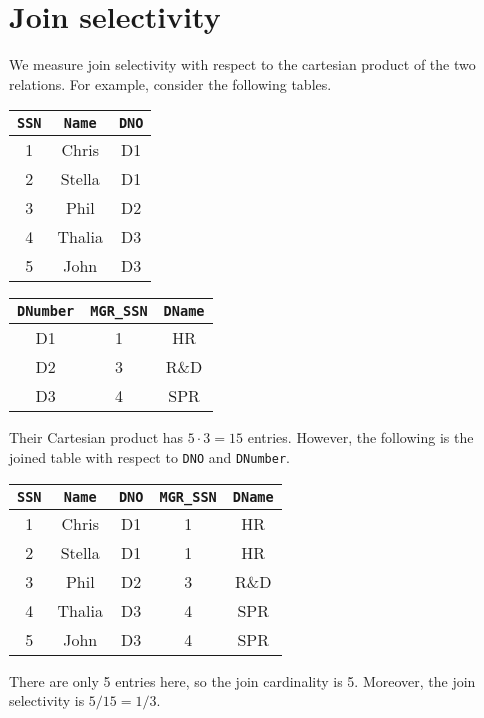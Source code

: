 \documentclass[a4paper, openany]{memoir}
\theoremstyle{definition}
\theoremstyle{plain}
\begin{document}
\section{Join selectivity}
We measure join selectivity with respect to the cartesian product of the two relations. For example, consider the following tables.
\begin{table}[H]
    \centering
    \begin{tabular}{|c|c|c|}
        \hline
        \texttt{SSN} & \texttt{Name} & \texttt{DNO} \\
        \hline
        1 & Chris & D1 \\
        2 & Stella & D1 \\
        3 & Phil & D2 \\
        4 & Thalia & D3 \\
        5 & John & D3 \\
        \hline
    \end{tabular}

    \hspace{10pt}

    \begin{tabular}{|c|c|c|}
        \hline
        \texttt{DNumber} & \texttt{MGR\_SSN} & \texttt{DName} \\
        \hline
        D1 & 1 & HR \\
        D2 & 3 & R\&D \\
        D3 & 4 & SPR \\
        \hline
    \end{tabular}
\end{table}
\noindent Their Cartesian product has $5 \cdot 3 = 15$ entries. However, the following is the joined table with respect to \texttt{DNO} and \texttt{DNumber}.
\begin{table}[H]
    \centering
    \begin{tabular}{|c|c|c|c|c|}
        \hline
        \texttt{SSN} & \texttt{Name} & \texttt{DNO} & \texttt{MGR\_SSN} & \texttt{DName} \\
        \hline
        1 & Chris & D1 & 1 & HR \\
        2 & Stella & D1 & 1 & HR \\
        3 & Phil & D2 & 3 & R\&D \\
        4 & Thalia & D3 & 4 & SPR \\
        5 & John & D3 & 4 & SPR \\
        \hline
    \end{tabular}
\end{table}
\noindent There are only 5 entries here, so the join cardinality is 5. Moreover, the join selectivity is $5/15 = 1/3$.
\end{document}
